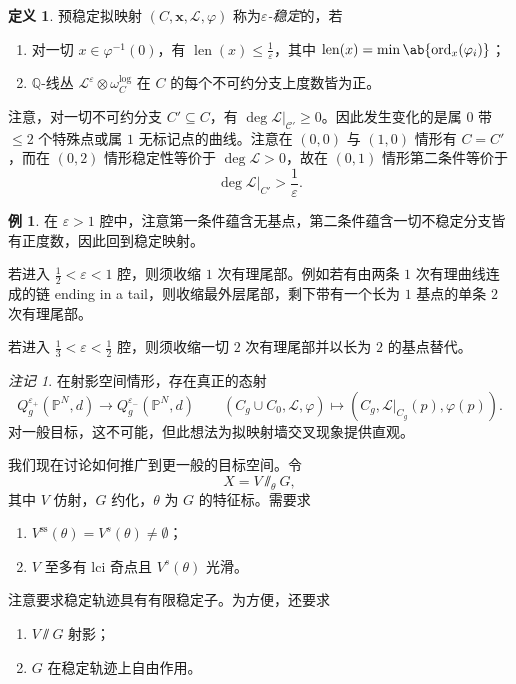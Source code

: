 \documentclass{amsart}
\theoremstyle{definition}
\newtheorem{defn}[thm]{定义}
\newtheorem{exm}[thm]{例}
\theoremstyle{remark}
\newtheorem{rmk}[thm]{注记}
\theoremstyle{plain}
\theoremstyle{definition}
\theoremstyle{remark}
\newcommand{\Q}{\mathbb{Q}}
\renewcommand{\P}{\mathbb{P}}
\newcommand{\ep}{\varepsilon}
\newcommand{\mc}[1]{\mathcal{#1}}
\newcommand{\mr}[1]{\mathrm{#1}}
\newcommand{\on}[1]{\operatorname{#1}}
\newcommand{\1}{\mathbf{1}}
\newcommand{\2}{\mathbf{2}}
\newcommand{\3}{\mathbf{3}}
\begin{document}
\begin{defn}
    预稳定拟映射 \((C, \mathbf{x}, \mc{L}, \varphi)\) 称为\textit{\(\ep\)-稳定}的，若
    \begin{enumerate}
        \item 对一切 \(x \in \varphi^{-1}(0)\)，有 \(\on{len}(x) \leq \frac{1}{\ep}\)，其中 \(\on{len}(x) = \min \ab\{ \on{ord}_x (\varphi_i)\}\)；
        \item \(\Q\)-线丛 \(\mc{L}^{\ep} \otimes \omega_C^{\log}\) 在 \(C\) 的每个不可约分支上度数皆为正。
    \end{enumerate}
\end{defn}

注意，对一切不可约分支 \(C' \subseteq C\)，有 \(\deg \mc{L}|_{\mc{C}'} \geq 0\)。因此发生变化的是属 \(0\) 带 \(\leq 2\) 个特殊点或属 \(1\) 无标记点的曲线。注意在 \((0,0)\) 与 \((1,0)\) 情形有 \(C = C'\)，而在 \((0,2)\) 情形稳定性等价于 \(\deg \mc{L} > 0\)，故在 \((0,1)\) 情形第二条件等价于
\[ \deg \mc{L}|_{C'} > \frac{1}{\ep}. \]

\begin{exm}
    在 \(\ep > 1\) 腔中，注意第一条件蕴含无基点，第二条件蕴含一切不稳定分支皆有正度数，因此回到稳定映射。

    若进入 \(\frac{1}{2} < \ep < 1\) 腔，则须收缩 \(1\) 次有理尾部。例如若有由两条 \(1\) 次有理曲线连成的链 ending in a tail，则收缩最外层尾部，剩下带有一个长为 \(1\) 基点的单条 \(2\) 次有理尾部。

    若进入 \(\frac{1}{3} < \ep < \frac{1}{2}\) 腔，则须收缩一切 \(2\) 次有理尾部并以长为 \(2\) 的基点替代。
\end{exm}

\begin{rmk}
    在射影空间情形，存在真正的态射
    \[ Q_g^{\ep_+}(\P^N, d) \to Q_g^{\ep_-}(\P^N, d) \qquad (C_g \cup C_0, \mc{L}, \varphi) \mapsto (C_g, \mc{L}|_{C_g}(p), \varphi(p)). \]
    对一般目标，这不可能，但此想法为拟映射墙交叉现象提供直观。
\end{rmk}

我们现在讨论如何推广到更一般的目标空间。令
\[ X = V \sslash_{\theta} G, \]
其中 \(V\) 仿射，\(G\) 约化，\(\theta\) 为 \(G\) 的特征标。需要求
\begin{enumerate}
    \item \(V^{\mr{ss}}(\theta) = V^s(\theta) \neq \emptyset\)；
    \item \(V\) 至多有 lci 奇点且 \(V^s(\theta)\) 光滑。
\end{enumerate}
注意要求稳定轨迹具有有限稳定子。为方便，还要求
\begin{enumerate}
    \item \(V \sslash G\) 射影；
    \item \(G\) 在稳定轨迹上自由作用。
\end{enumerate}
\end{document}
